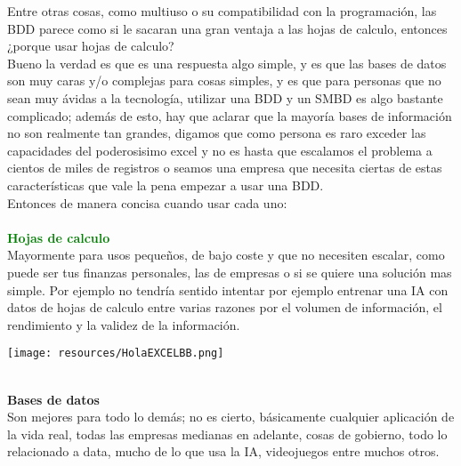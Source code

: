 Entre otras cosas, como multiuso o su compatibilidad con la programación, las BDD parece como si le sacaran una gran ventaja a las hojas de calculo, entonces ¿porque usar hojas de calculo?\\

Bueno la verdad es que es una respuesta algo simple, y es que las bases de datos son muy caras y/o complejas para cosas simples, y es que para personas que no sean muy ávidas a la tecnología, utilizar una BDD y un SMBD es algo bastante complicado; además de esto, hay que aclarar que la mayoría bases de información no son realmente tan grandes, digamos que como persona es raro exceder las capacidades del poderosisimo excel y no es hasta que escalamos el problema a cientos de miles de registros o seamos una empresa que necesita ciertas de estas características que vale la pena empezar a usar una BDD.\\

Entonces de manera concisa cuando usar cada uno:\\\\
\textcolor{Green}{\textbf{Hojas de calculo}}\\
Mayormente para usos pequeños, de bajo coste y que no necesiten escalar, como puede ser tus finanzas personales, las de empresas o si se quiere una solución mas simple. Por ejemplo no tendría sentido intentar por ejemplo entrenar una IA con datos de hojas de calculo entre varias razones por el volumen de información, el rendimiento y la validez de la información.
\begin{center}
    \texttt{[image: resources/HolaEXCELBB.png]}\\
    \cite{FinanzasP}\\
\end{center}

\textcolor{bibi}{\textbf{Bases de datos}}\\
Son mejores para todo lo demás; no es cierto, básicamente cualquier aplicación de la vida real, todas las empresas medianas en adelante, cosas de gobierno, todo lo relacionado a data, mucho de lo que usa la IA, videojuegos entre muchos otros.\\\\
